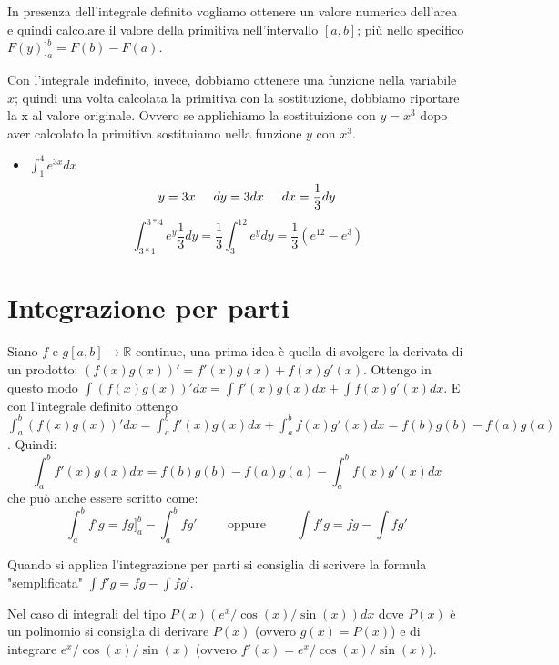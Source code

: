 In presenza dell'integrale definito vogliamo ottenere un valore numerico dell'area e quindi calcolare il valore della primitiva nell'intervallo $[a,b]$; più nello specifico $F(y)]^b_a=F(b)-F(a)$. 

Con l'integrale indefinito, invece, dobbiamo ottenere una funzione nella variabile $x$; quindi una volta calcolata la primitiva con la sostituzione, dobbiamo riportare la x al valore originale. Ovvero se applichiamo la sostituizione con $y=x^3$ dopo aver calcolato la primitiva sostituiamo nella funzione $y$ con $x^3$.

\begin{example}\phantom{}
\begin{itemize}
    \item $\int^4_1e^{3x}dx$\begin{equation*}y=3x\hspace{0.5cm}dy=3dx\hspace{0.5cm}dx=\frac{1}{3}dy\end{equation*}
    \begin{equation*}\int^{3*4}_{3*1}e^y\frac{1}{3}dy=\frac{1}{3}\int^{12}_3e^ydy=\frac{1}{3}(e^12-e^3)\end{equation*}
\end{itemize}
\end{example}

\section{Integrazione per parti}
Siano $f$ e $g[a,b]\to\mathbb{R}$ continue, una prima idea è quella di svolgere la derivata di un prodotto: $(f(x)g(x))'=f'(x)g(x)+f(x)g'(x)$. Ottengo in questo modo $\int (f(x)g(x))'dx=\int f'(x)g(x)dx+\int f(x)g'(x)dx$. E con l'integrale definito ottengo $\int^b_a (f(x)g(x))'dx=\int^b_a f'(x)g(x)dx+\int^b_a f(x)g'(x)dx=f(b)g(b)-f(a)g(a)$. Quindi:
\begin{equation*}
    \int^b_a f'(x)g(x)dx=f(b)g(b)-f(a)g(a)-\int^b_a f(x)g'(x)dx
\end{equation*}
che può anche essere scritto come:
\begin{equation*}
    \int^b_a f'g=fg]^b_a-\int^b_a fg'\hspace{1cm}\text{oppure}\hspace{1cm}\int f'g=fg-\int fg'
\end{equation*}

\begin{osservation*}
    Quando si applica l'integrazione per parti si consiglia di scrivere la formula "semplificata" $\int f'g=fg-\int fg'$.
    
    Nel caso di integrali del tipo $P(x)(e^x/\cos(x)/\sin(x))dx$ dove $P(x)$ è un polinomio si consiglia di derivare $P(x)$ (ovvero $g(x)=P(x)$) e di integrare $e^x/\cos(x)/\sin(x)$ (ovvero $f'(x)=e^x/\cos(x)/\sin(x)$).
\end{osservation*}

